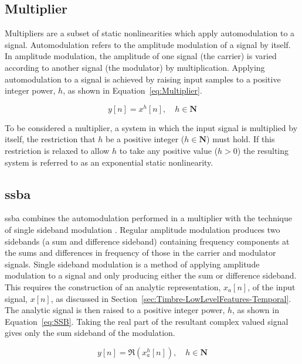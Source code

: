 	\subsection{Multiplier}
	\label{sec:Excitation-Methods-Multiplier}
		Multipliers are a subset of static nonlinearities which apply automodulation to a signal. Automodulation
		refers to the amplitude modulation of a signal by itself. In amplitude modulation, the amplitude of one
		signal (the carrier) is varied according to another signal (the modulator) by multiplication.  Applying
		automodulation to a signal is achieved by raising input samples to a positive integer power, $h$, as shown
		in Equation~\ref{eq:Multiplier}.

		\begin{equation}
			y[n] = x^{h}[n], \quad h \in \textbf{N}
			\label{eq:Multiplier}
		\end{equation}

		To be considered a multiplier, a system in which the input signal is multiplied by itself, the restriction
		that $h$ be a positive integer ($h \in \textbf{N}$) must hold. If this restriction is relaxed to allow $h$
		to take any positive value ($h > 0$) the resulting system is referred to as an exponential static
		nonlinearity.

	\subsection{\acrlong{ssba}}
	\label{sec:Excitation-Methods-SSBA}
		\acrfull{ssba} combines the automodulation performed in a multiplier with the technique of single sideband
		modulation \citep{corinthios2009signals}. Regular amplitude modulation produces two sidebands (a sum and
		difference sideband) containing frequency components at the sums and differences in frequency of those in
		the carrier and modulator signals. Single sideband modulation is a method of applying amplitude modulation
		to a signal and only producing either the sum or difference sideband. This requires the construction of an
		analytic representation, $x_{a}[n]$, of the input signal, $x[n]$, as discussed in
		Section~\ref{sec:Timbre-LowLevelFeatures-Temporal}. The analytic signal is then raised to a positive
		integer power, $h$, as shown in Equation~\ref{eq:SSB}. Taking the real part of the resultant complex valued
		signal gives only the sum sideband of the modulation.

		\begin{equation}
			y[n] = \Re \left( x_{a}^{h}[n] \right), \quad h \in \textbf{N}
			\label{eq:SSB}
		\end{equation}

